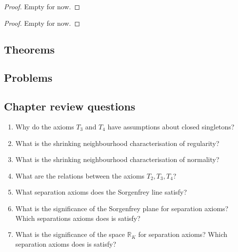 
\begin{proof}
Empty for now.
\end{proof}


\begin{proof}
Empty for now.
\end{proof}
\subsection{Theorems}

\subsection{Problems}

\subsection{Chapter review questions}

\begin{enumerate}
    \item Why do the axioms \( T_3 \) and \( T_4 \) have assumptions about closed singletons?

    \item What is the shrinking neighbourhood characterisation of regularity?

    \item What is the shrinking neighbourhood characterisation of normality?

    \item What are the relations between the axioms \( T_2, T_3, T_4 \)?

    \item What separation axioms does the Sorgenfrey line satisfy?

    \item What is the significance of the Sorgenfrey plane for separation axioms? Which separations axioms does is satisfy?

    \item What is the significance of the space \( \mathbb{R}_K \) for separation axioms? Which separation axioms does is satisfy?
\end{enumerate}


